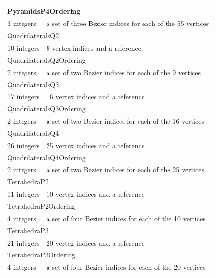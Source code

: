 \documentclass[a4paper,12pt]{article}
\begin{document}
\begin{longtable}{|m{4cm}|m{11cm}|}
\multicolumn{2}{|l|}{PyramidsP4Ordering} \\
\hline
3 integers & a set of three Bezier indices for each of the 55 vertices \\
\hline\hline

\multicolumn{2}{|l|}{QuadrilateralsQ2} \\
\hline
10 integers & 9 vertex indices and a reference \\
\hline\hline

\multicolumn{2}{|l|}{QuadrilateralsQ2Ordering} \\
\hline
2 integers & a set of two Bezier indices for each of the 9 vertices \\
\hline\hline

\multicolumn{2}{|l|}{QuadrilateralsQ3} \\
\hline
17 integers & 16 vertex indices and a reference \\
\hline\hline

\multicolumn{2}{|l|}{QuadrilateralsQ3Ordering} \\
\hline
2 integers & a set of two Bezier indices for each of the 16 vertices \\
\hline\hline

\multicolumn{2}{|l|}{QuadrilateralsQ4} \\
\hline
26 integers & 25 vertex indices and a reference \\
\hline\hline

\multicolumn{2}{|l|}{QuadrilateralsQ4Ordering} \\
\hline
2 integers & a set of two Bezier indices for each of the 25 vertices \\
\hline\hline

\multicolumn{2}{|l|}{TetrahedraP2} \\
\hline
11 integers & 10 vertex indices and a reference \\
\hline\hline

\multicolumn{2}{|l|}{TetrahedraP2Ordering} \\
\hline
4 integers & a set of four Bezier indices for each of the 10 vertices \\
\hline\hline

\multicolumn{2}{|l|}{TetrahedraP3} \\
\hline
21 integers & 20 vertex indices and a reference \\
\hline\hline

\multicolumn{2}{|l|}{TetrahedraP3Ordering} \\
\hline
4 integers & a set of four Bezier indices for each of the 20 vertices \\
\hline\hline


\end{longtable}
\end{document}
